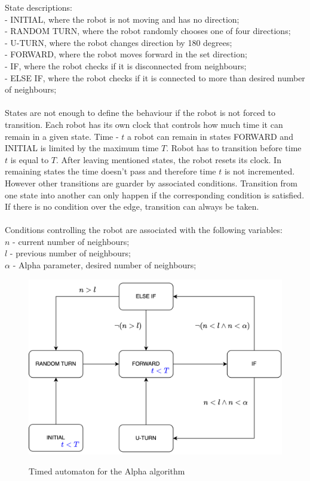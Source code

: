 \noindent State descriptions:\\
- INITIAL, where the robot is not moving and has no direction;\\
- RANDOM TURN, where the robot randomly chooses one of four directions;\\
- U-TURN, where the robot changes direction by 180 degrees;\\
- FORWARD, where the robot moves forward in the set direction;\\
- IF, where the robot checks if it is disconnected from neighbours;\\
- ELSE IF, where the robot checks if it is connected to more than desired number of neighbours;\\\\
States are not enough to define the behaviour if the robot is not forced to transition. Each robot has its own clock that controls how much time it can remain in a given state. Time - $t$ a robot can remain in states FORWARD and INITIAL is limited by the maximum time $T$.
Robot has to transition before time $t$ is equal to $T$. After leaving mentioned states, the robot resets its clock. In remaining states the time doesn't pass and therefore time $t$ is not incremented. However other transitions are guarder by associated conditions. Transition from one state into another can only happen if the corresponding condition is satisfied. If there is no condition over the edge, transition can always be taken.\\\\ Conditions controlling the robot are associated with the following variables:\\
$n$ - current number of neighbours;\\
$l$ - previous number of neighbours;\\
$\alpha$ - Alpha parameter, desired number of neighbours;\\
\begin{figure}[H]
\caption{Timed automaton for the Alpha algorithm}
\includegraphics[width=\textwidth]{images/automaton.png}
\label{fig:automaton}
\end{figure}